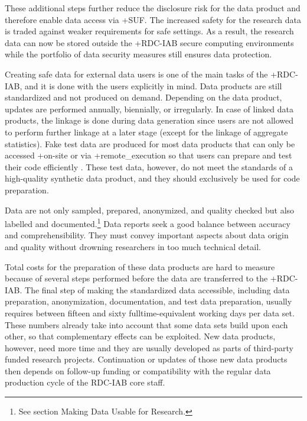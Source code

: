 \documentclass[
]{WileySix}
\begin{document}
These additional steps further reduce the disclosure risk for the data product and therefore enable data access via +SUF\textbar. The increased safety for the research data is traded against weaker requirements for safe settings. As a result, the research data can now be stored outside the +RDC-IAB\textbar{} secure computing environments while the portfolio of data security measures still ensures data protection.

Creating safe data for external data users is one of the main tasks of the +RDC-IAB\textbar, and it is done with the users explicitly in mind. Data products are still standardized and not produced on demand. Depending on the data product, updates are performed annually, biennially, or irregularly. In case of linked data products, the linkage is done during data generation since users are not allowed to perform further linkage at a later stage (except for the linkage of aggregate statistics). Fake test data are produced for most data products that can only be accessed +on-site\textbar{} or via +remote\_execution\textbar{} so that users can prepare and test their code efficiently \citep{jacobebbinghaus2010}. These test data, however, do not meet the standards of a high-quality synthetic data product, and they should exclusively be used for code preparation.

Data are not only sampled, prepared, anonymized, and quality checked but also labelled and documented.\footnote{See section Making Data Usable for Research.} Data reports seek a good balance between accuracy and comprehensibility. They must convey important aspects about data origin and quality without drowning researchers in too much technical detail.

Total costs for the preparation of these data products are hard to measure because of several steps performed before the data are transferred to the +RDC-IAB\textbar. The final step of making the standardized data accessible, including data preparation, anonymization, documentation, and test data preparation, usually requires between fifteen and sixty fulltime-equivalent working days per data set. These numbers already take into account that some data sets build upon each other, so that complementary effects can be exploited. New data products, however, need more time and they are usually developed as parts of third-party funded research projects. Continuation or updates of those new data products then depends on follow-up funding or compatibility with the regular data production cycle of the RDC-IAB core staff.
\end{document}
